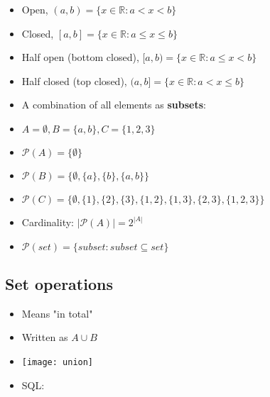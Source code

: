 \documentclass[english,10pt,a4paper]{article}
\begin{document}
\begin{theo}[Intervals] 
\begin{itemize}
\item Open, $(a,b) = \{ x \in \mathbb{R}: a < x < b \}$
\item Closed, $[a,b] = \{ x \in \mathbb{R}: a \leq x \leq b \}$
\item Half open (bottom closed), $[a,b) = \{ x \in \mathbb{R}: a \leq x < b \}$
\item Half closed (top closed), $(a,b] = \{ x \in \mathbb{R}: a < x \leq b \}$
\end{itemize}
\end{theo}


\begin{theo} 
\begin{itemize}
\item A combination of all elements as \textbf{subsets}:
\item[] $A=\emptyset, B= \{a,b\}, C=\{1,2,3\}$
\item $\mathcal{P}(A) = \{\emptyset\} $
\item $\mathcal{P}(B) = \{\emptyset, \{a\}, \{b\}, \{a,b\} \}$
\item $\mathcal{P}(C) = \{\emptyset, \{1\}, \{2\}, \{3\}, \{1,2\}, \{1,3\}, \{2, 3\}, \{1,2,3\} \}$
\item Cardinality: $|\mathcal{P}(A)| = 2^{|A|}$
\item $\mathcal{P}(set) = \{subset : subset \subseteq set\}$
\end{itemize}
\end{theo}



\subsection{Set operations}
\begin{theo}[Union] 
\begin{itemize}
\item Means "in total"
\item Written as $A \cup B$
\item[] \texttt{[image: union]} 
\item SQL: 
\end{itemize}

\end{theo}
\end{document}
